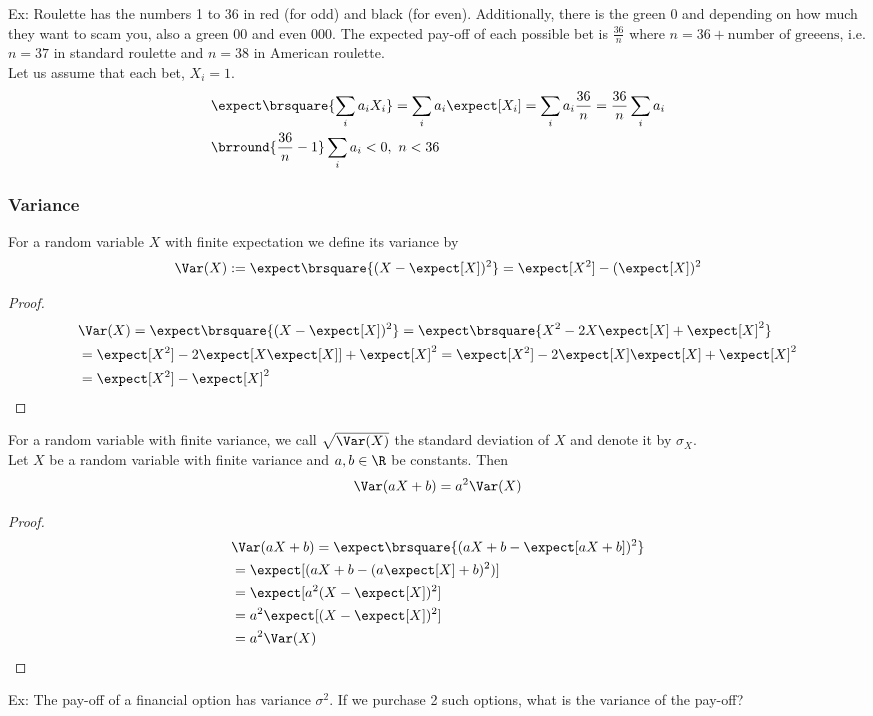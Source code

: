 Ex: Roulette has the numbers 1 to 36 in red (for odd) and black (for even). Additionally, there is the green 0 and depending on how much they want to scam you, also a green 00 and even 000. The expected pay-off of each possible bet is $\frac{36}{n}$ where $n=36+\text{number of greeens}$, i.e. $n=37$ in standard roulette and $n=38$ in American roulette.\\
Let us assume that each bet, $X_i=1$.
\begin{align*}
    &\expect\brsquare{\sum_i a_iX_i}=\sum_i a_i\expect[X_i]=\sum_i a_i\frac{36}{n}=\frac{36}{n}\sum_i a_i\\
    &\brround{\frac{36}{n}-1}\sum_i a_i<0,\ n<36
\end{align*}

\subsubsection{Variance}
For a random variable $X$ with finite expectation we define its variance by
\[\Var(X):=\expect\brsquare{(X-\expect[X])^2}=\expect[X^2]-(\expect[X])^2\]
\begin{proof}
    \begin{align*}
        &\Var(X)=\expect\brsquare{(X-\expect[X])^2}=\expect\brsquare{X^2-2X\expect[X]+\expect[X]^2}\\
        &=\expect[X^2]-2\expect[X\expect[X]]+\expect[X]^2=\expect[X^2]-2\expect[X]\expect[X]+\expect[X]^2\\
        &=\expect[X^2]-\expect[X]^2
    \end{align*}
\end{proof}
For a random variable with finite variance, we call $\sqrt{\Var(X)}$ the standard deviation of $X$ and denote it by $\sigma_X$.\\
Let $X$ be a random variable with finite variance and $a,b\in\R$ be constants. Then
\[\Var(aX+b)=a^2\Var(X)\]
\begin{proof}
    \begin{align*}
        &\Var(aX+b)=\expect\brsquare{(aX+b-\expect[aX+b])^2}\\
        &=\expect[(aX+b-(a\expect[X]+b)^2)]\\
        &=\expect[a^2(X-\expect[X])^2]\\
        &=a^2\expect[(X-\expect[X])^2]\\
        &=a^2\Var(X)
    \end{align*}
\end{proof}
Ex: The pay-off of a financial option has variance $\sigma^2$. If we purchase 2 such options, what is the variance of the pay-off?
